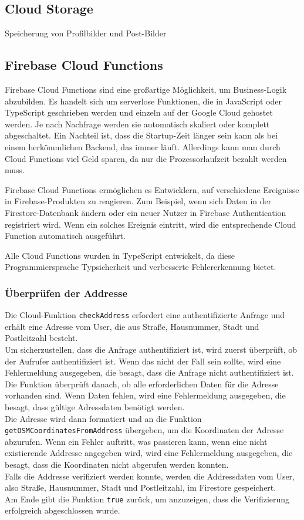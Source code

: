 \subsection{Cloud Storage}
Speicherung von Profilbilder und Post-Bilder
\subsection{Firebase Cloud Functions}
Firebase Cloud Functions sind eine großartige Möglichkeit,
um Business-Logik abzubilden. Es handelt sich um serverlose
Funktionen, die in JavaScript oder TypeScript geschrieben
werden und einzeln auf der Google Cloud gehostet werden. Je
nach Nachfrage werden sie automatisch skaliert oder komplett
abgeschaltet. Ein Nachteil ist, dass die Startup-Zeit länger
sein kann als bei einem herkömmlichen Backend, das immer
läuft. Allerdings kann man durch Cloud Functions viel Geld
sparen, da nur die Prozessorlaufzeit bezahlt werden muss.

Firebase Cloud Functions ermöglichen es Entwicklern, auf verschiedene Ereignisse in Firebase-Produkten zu reagieren. Zum Beispiel, wenn sich Daten in der Firestore-Datenbank ändern oder ein neuer Nutzer in Firebase Authentication registriert wird. Wenn ein solches Ereignis eintritt, wird die entsprechende Cloud Function automatisch ausgeführt.

Alle Cloud Functions wurden in TypeScript entwickelt, da diese Programmiersprache Typsicherheit und verbesserte Fehlererkennung bietet.

\subsubsection{Überprüfen der Addresse}

Die Cloud-Funktion \texttt{checkAddress} erfordert eine authentifizierte Anfrage und erhält eine Adresse vom User, die aus Straße, Hausnummer, Stadt und Postleitzahl besteht.
\\
Um sicherzustellen, dass die Anfrage authentifiziert ist, wird zuerst überprüft, ob der Aufrufer authentifiziert ist. Wenn das nicht der Fall sein sollte, wird eine Fehlermeldung ausgegeben, die besagt, dass die Anfrage nicht authentifiziert ist.
\\
Die Funktion überprüft danach, ob alle erforderlichen Daten für die Adresse vorhanden sind. Wenn Daten fehlen, wird eine Fehlermeldung ausgegeben, die besagt, dass gültige Adressdaten benötigt werden.
\\
Die Adresse wird dann formatiert und an die Funktion \texttt{getOSMCoordinatesFromAddress} übergeben, um die Koordinaten der Adresse abzurufen. Wenn ein Fehler auftritt, was passieren kann, wenn eine nicht existierende Addresse angegeben wird, wird eine Fehlermeldung ausgegeben, die besagt, dass die Koordinaten nicht abgerufen werden konnten.
\\
Falls die Addresse verifiziert werden konnte, werden die Addressdaten vom User, also Straße, Hausnummer, Stadt und Postleitzahl, im Firestore gespeichert.
\\
Am Ende gibt die Funktion \texttt{true} zurück, um anzuzeigen, dass die Verifizierung erfolgreich abgeschlossen wurde.

